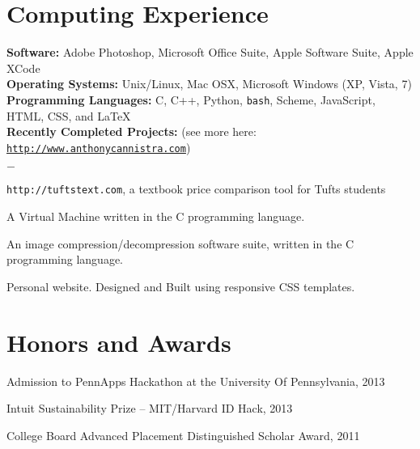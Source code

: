 \documentclass[margin,line]{res}
\newenvironment{list1}{
  \begin{list}{\ding{113}}{%
      \setlength{\itemsep}{0in}
      \setlength{\parsep}{0in} \setlength{\parskip}{0in}
      \setlength{\topsep}{0in} \setlength{\partopsep}{0in} 
      \setlength{\leftmargin}{0.17in}}}{\end{list}}
\newenvironment{list2}{
  \begin{list}{$-$}{%
      \setlength{\itemsep}{0in}
      \setlength{\parsep}{0in} \setlength{\parskip}{0in}
      \setlength{\topsep}{0in} \setlength{\partopsep}{0in} 
      \setlength{\leftmargin}{0.2in}}}{\end{list}}
\begin{document}
\begin{resume}
\section{\sc Computing Experience}
{\bf Software:} Adobe Photoshop, Microsoft Office Suite, Apple Software Suite, Apple XCode \\
{\bf Operating Systems:} Unix/Linux, Mac OSX, Microsoft Windows (XP, Vista, 7) \\
{\bf Programming Languages:} C, C++, Python, \verb+bash+, Scheme, JavaScript,  HTML, CSS, and \LaTeX \\
{\bf Recently Completed Projects:} { (see more here: \href{http://www.anthonycannistra.com/portfolios.html}{\nolinkurl{http://www.anthonycannistra.com}}}) 
\begin{list1}
\item []
\begin{list2}
\item \texttt{http://tuftstext.com}, a textbook price comparison tool for Tufts students

\item A Virtual Machine written in the C programming language.
\item An image compression/decompression software suite, written in the C programming language.
\item Personal website. Designed and Built using responsive CSS templates.
\end{list2}
\end{list1}
\section{\sc Honors and Awards}

Admission to PennApps Hackathon at the University Of Pennsylvania, 2013
\vspace*{-.15in}

Intuit Sustainability Prize -- MIT/Harvard ID Hack, 2013
\vspace*{-.15in}


College Board Advanced Placement Distinguished Scholar Award, 2011 
\vspace*{-.15in}


\end{resume}
\end{document}
